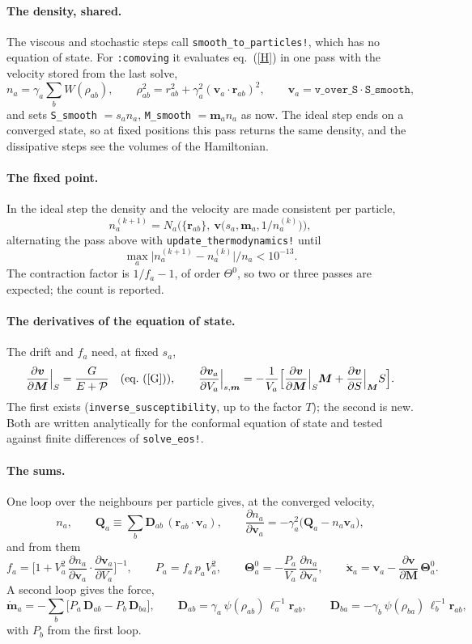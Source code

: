 \documentclass[11pt,aps,preprint,nofootinbib,superscriptaddress,tightenlines]{revtex4-2}
\def\st{\begin{equation}}
\def\stp{\end{equation}}
\def\Eq#1{eq.~(\ref{#1})}
\let\oldparagraph\paragraph
\renewcommand{\paragraph}{\par\bigskip\oldparagraph}
\begin{document}
\paragraph{The density, shared.}  The viscous and stochastic steps call \texttt{smooth\_to\_particles!}, which has no equation of state.
For \texttt{:comoving} it evaluates \Eq{H} in one pass with the velocity stored from the last solve,
\st
n_a=\gamma_a\sum_bW(\rho_{ab}),\qquad \rho_{ab}^2=r_{ab}^2+\gamma_a^2(\bm v_a\cdot\bm r_{ab})^2,\qquad \bm v_a=\texttt{v\_over\_S}\cdot\texttt{S\_smooth},
\stp
and sets \texttt{S\_smooth} $=s_an_a$, \texttt{M\_smooth} $=\bm m_an_a$ as now.  The ideal step ends on a converged state, so at fixed positions this
pass returns the same density, and the dissipative steps see the volumes of the Hamiltonian.

\paragraph{The fixed point.}  In the ideal step the density and the velocity are made consistent per particle,
\st
n_a^{(k+1)}=N_a\Big(\{\bm r_{ab}\},\ \bm v\big(s_a,\bm m_a,1/n_a^{(k)}\big)\Big) ,
\stp
alternating the pass above with \texttt{update\_thermodynamics!} until
\st
\max_a\big|n_a^{(k+1)}-n_a^{(k)}\big|/n_a<10^{-13} .
\stp
The contraction factor is $1/f_a-1$, of order $\Theta^0$, so two or three passes are expected; the count is reported.

\paragraph{The derivatives of the equation of state.}  The drift and $f_a$ need, at fixed $s_a$,
\st
\frac{\partial\bm v}{\partial\bm M}\Big|_S=\frac{G}{E+\mathcal P}\quad\text{(\Eq{G})},\qquad
\frac{\partial\bm v_a}{\partial V_a}\Big|_{s,\bm m}=-\frac1{V_a}\Big[\frac{\partial\bm v}{\partial\bm M}\Big|_S\bm M+\frac{\partial\bm v}{\partial S}\Big|_{\bm M}S\Big] .
\stp
The first exists (\texttt{inverse\_susceptibility}, up to the factor $T$); the second is new.  Both are written analytically for the conformal
equation of state and tested against finite differences of \texttt{solve\_eos!}.

\paragraph{The sums.}  One loop over the neighbours per particle gives, at the converged velocity,
\st
n_a,\qquad
\bm Q_a\equiv\sum_b\bm D_{ab}\,(\bm r_{ab}\cdot\bm v_a),\qquad
\frac{\partial n_a}{\partial\bm v_a}=-\gamma_a^2\big(\bm Q_a-n_a\bm v_a\big),
\stp
and from them
\st
f_a=\Big[1+V_a^2\,\frac{\partial n_a}{\partial\bm v_a}\cdot\frac{\partial\bm v_a}{\partial V_a}\Big]^{-1},\qquad
P_a=f_a\,p_aV_a^2,\qquad
\bm\Theta^0_a=-\frac{P_a}{V_a}\,\frac{\partial n_a}{\partial\bm v_a},\qquad
\dot{\bm x}_a=\bm v_a-\frac{\partial\bm v}{\partial\bm M}\,\bm\Theta^0_a .
\stp
A second loop gives the force,
\st
\dot{\bm m}_a=-\sum_b\big[P_a\,\bm D_{ab}-P_b\,\bm D_{ba}\big],\qquad
\bm D_{ab}=\gamma_a\,\psi(\rho_{ab})\,\ell_a^{-1}\bm r_{ab},\qquad
\bm D_{ba}=-\gamma_b\,\psi(\rho_{ba})\,\ell_b^{-1}\bm r_{ab} ,
\stp
with $P_b$ from the first loop.
\end{document}
